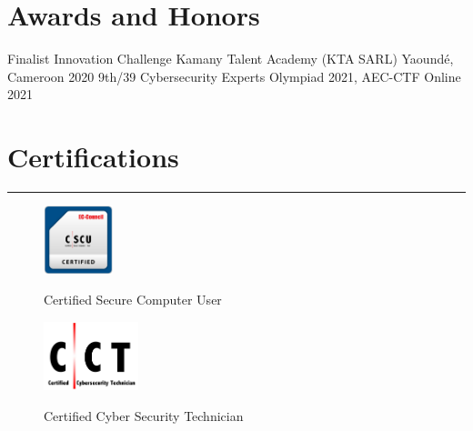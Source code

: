 \section{Awards and Honors}
\begin{cvhonors}

\cvhonor
{Finalist} %
{Innovation Challenge Kamany Talent Academy (KTA SARL)} %
{Yaoundé, Cameroon} %
{2020} %
\cvhonor
{9th/39} %
{Cybersecurity Experts Olympiad 2021, AEC-CTF} %
{Online} %
{2021} %

\end{cvhonors}


\section{Certifications}

\begin{center}
{\color{blue} \rule{\linewidth}{1mm}}
\end{center}

\renewcommand{\figurename}{} %

\begin{figure}[htbp]
    \centering
    \begin{minipage}[t]{0.45\textwidth}
        \centering
        \href{https://aspen.eccouncil.org/VerifyBadge?type=certification&a=k0oDOJ1A+oFRUFqxi7ayyh4IMBf2VEh1mGt6WtgWbL4=}{
        \includegraphics[height=2cm]{badge/CSCU.png}}
        \caption*{Certified Secure Computer User}
    \end{minipage}
    \hfill
    \begin{minipage}[t]{0.45\textwidth}
        \centering
        \href{https://www.coursera.org/account/accomplishments/certificate/VH72LKQENH77}{
        \includegraphics[height=2cm]{badge/CCT.png}}
        \caption*{Certified Cyber Security Technician}
    \end{minipage}
\end{figure}

